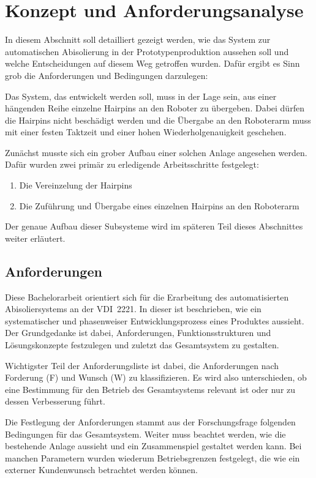 \section{Konzept und Anforderungsanalyse}\label{sec:Konzept}
In diesem Abschnitt soll detailliert gezeigt werden, wie das System
zur automatischen Abisolierung in der Prototypenproduktion aussehen soll und welche Entscheidungen auf diesem Weg
getroffen wurden.
Dafür ergibt es Sinn grob die Anforderungen und Bedingungen darzulegen:

Das System, das entwickelt werden soll, muss in der Lage sein, aus einer hängenden Reihe einzelne Hairpins
an den Roboter zu übergeben. Dabei dürfen die Hairpins nicht beschädigt werden und die Übergabe an den Roboterarm
muss mit einer festen Taktzeit und einer hohen Wiederholgenauigkeit geschehen.

Zunächst musste sich ein grober Aufbau einer solchen Anlage angesehen werden. Dafür wurden zwei primär zu erledigende
Arbeitsschritte festgelegt:
\begin{enumerate}
  \item Die Vereinzelung der Hairpins
  \item Die Zuführung und Übergabe eines einzelnen Hairpins an den Roboterarm
\end{enumerate}
Der genaue Aufbau dieser Subsysteme wird im späteren Teil dieses Abschnittes weiter erläutert.
%
\subsection{Anforderungen}\label{sec:Anforderung}
Diese Bachelorarbeit orientiert sich für die Erarbeitung des automatisierten Abisoliersystems an der VDI~2221.
In dieser ist beschrieben, wie ein systematischer und phasenweiser Entwicklungsprozess eines Produktes aussieht.
Der Grundgedanke ist dabei, Anforderungen, Funktionsstrukturen und Lösungskonzepte festzulegen und
zuletzt das Gesamtsystem zu gestalten.

Wichtigster Teil der Anforderungsliste ist dabei, die Anforderungen nach Forderung (F) und Wunsch (W) zu klassifizieren.
Es wird also unterschieden, ob eine Bestimmung für den Betrieb des Gesamtsystems relevant ist oder nur zu
dessen Verbesserung führt.

Die Festlegung der Anforderungen stammt aus der Forschungsfrage folgenden Bedingungen für das Gesamtsystem.
Weiter muss beachtet werden, wie die bestehende Anlage aussieht und ein Zusammenspiel gestaltet werden kann.
Bei manchen Parametern wurden wiederum Betriebsgrenzen festgelegt, die wie ein externer Kundenwunsch betrachtet
werden können.


